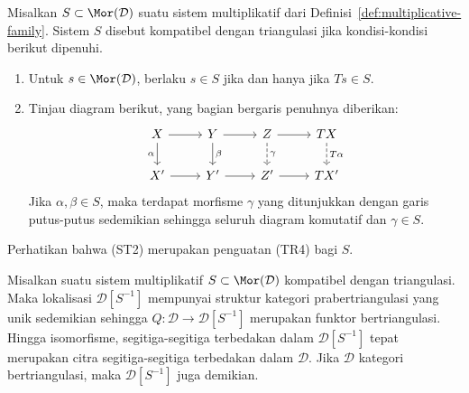 \begin{definisi}
	Misalkan $S \subset \Mor(\mathcal{D})$ suatu sistem multiplikatif dari
	Definisi~\ref{def:multiplicative-family}. Sistem $S$ disebut kompatibel
	dengan triangulasi jika kondisi-kondisi berikut dipenuhi.
	\begin{enumerate}[(ST1)]
		\item Untuk $s \in \Mor(\mathcal{D})$, berlaku $s \in S$ jika dan hanya
		jika $Ts \in S$.
		\item Tinjau diagram berikut, yang bagian bergaris penuhnya diberikan:
		\[\begin{tikzcd}
			X \arrow[d, "\alpha"'] \arrow[r] & Y \arrow[d, "\beta"] \arrow[r] & Z \arrow[dashed, d, "\gamma"] \arrow[r] & TX \arrow[dashed, d, "T\alpha"] \\
			X' \arrow[r] & Y' \arrow[r] & Z' \arrow[r] & TX'
		\end{tikzcd}\]
		Jika $\alpha, \beta \in S$, maka terdapat morfisme $\gamma$ yang ditunjukkan
		dengan garis putus-putus sedemikian sehingga seluruh diagram komutatif dan
		$\gamma \in S$.
	\end{enumerate}
\end{definisi}

Perhatikan bahwa (ST2) merupakan penguatan (TR4) bagi $S$.

\begin{proposisi}\label{prop:localization-triangulated}
	Misalkan suatu sistem multiplikatif $S \subset \Mor(\mathcal{D})$ kompatibel
	dengan triangulasi. Maka lokalisasi $\mathcal{D}[S^{-1}]$ mempunyai struktur
	kategori prabertriangulasi yang unik sedemikian sehingga
	$Q: \mathcal{D} \to \mathcal{D}[S^{-1}]$ merupakan funktor bertriangulasi.
	Hingga isomorfisme, segitiga-segitiga terbedakan dalam
	$\mathcal{D}[S^{-1}]$ tepat merupakan citra segitiga-segitiga terbedakan
	dalam $\mathcal{D}$. Jika $\mathcal{D}$ kategori bertriangulasi, maka
	$\mathcal{D}[S^{-1}]$ juga demikian.
\end{proposisi}


